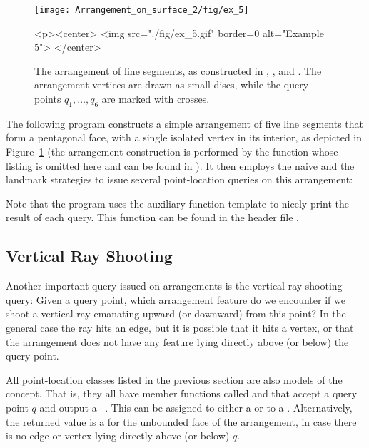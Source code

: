 \begin{figure}[t]
\begin{ccTexOnly}
  \begin{center}
  \texttt{[image: Arrangement\_on\_surface\_2/fig/ex\_5]}
  \end{center}
\end{ccTexOnly}
\begin{ccHtmlOnly}
  <p><center>
  <img src="./fig/ex_5.gif" border=0 alt="Example 5">
  </center>
\end{ccHtmlOnly}
\caption{The arrangement of line segments, as constructed in
, , and
. The
arrangement vertices are drawn as small discs, while the query
points $q_1, \ldots, q_6$ are marked with crosses.\label{arr_fig:ex_5}}
\end{figure}

The following program constructs a simple arrangement of five line
segments that form a pentagonal face, with a single isolated
vertex in its interior, as depicted in Figure~\ref{arr_fig:ex_5}
(the arrangement construction is performed by the function
 whose listing is omitted here and
can be found in ).
It then employs the naive and the landmark strategies to issue
several point-location queries on this arrangement:


Note that the program uses the auxiliary
 function template to nicely print the
result of each query. This function can be found in the header file
.

\subsection{Vertical Ray Shooting\label{arr_ssec:ray_shoot}}

Another important query issued on arrangements is the vertical
ray-shooting query: Given a query point, which arrangement feature
do we encounter if we shoot a vertical ray emanating upward (or
downward) from this point? In the general case the ray hits an
edge, but it is possible that it hits a vertex, or that the
arrangement does not have any feature lying directly above (or
below) the query point.

All point-location classes listed in the previous section are also models
of the  concept. That is, they all
have member functions called  and
 that accept a query point $q$ and output a
\cgal\ . This can be assigned to either a
 or to a .
Alternatively, the returned value is a 
for the unbounded face of the arrangement, in case there is no edge
or vertex lying directly above (or below) $q$.

